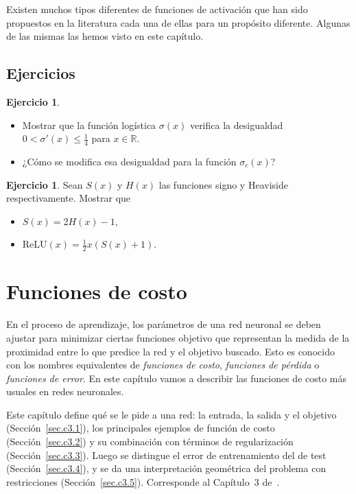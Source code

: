 \documentclass[12pt, a4paper]{amsbook}
\newcommand{\R}{{\mathbb R}}
\theoremstyle{remark}
\theoremstyle{definition}
\newtheorem{ejer}[teo]{Ejercicio}
\numberwithin{section}{chapter}
\numberwithin{subsection}{section}
\numberwithin{equation}{section}
\numberwithin{figure}{chapter}
\begin{document}
Existen muchos tipos diferentes de funciones de activación que han sido propuestos en la literatura cada una de ellas para un propósito diferente. Algunas de las mismas las hemos visto en este capítulo.


\section{Ejercicios}\label{sec.c2.3}
\begin{ejer}
\begin{itemize}
\item[(a)] Mostrar que la función logística $\sigma(x)$ verifica la desigualdad $0<\sigma'(x)\le \frac14$ para $x\in\R$.

\item[(b)] ¿Cómo se modifica esa desigualdad para la función $\sigma_c(x)$?
\end{itemize}
\end{ejer}

\begin{ejer}
Sean $S(x)$ y $H(x)$ las funciones signo y Heaviside respectivamente. Mostrar que
\begin{itemize}
\item[(a)] $S(x)=2H(x) - 1$,

\item[(b)] $\text{ReLU}(x) = \frac12 x(S(x)+1)$.
\end{itemize}
\end{ejer}



\chapter{Funciones de costo}\label{cap3}

En el proceso de aprendizaje, los parámetros de una red neuronal se deben ajustar para minimizar ciertas funciones objetivo que representan la medida de la proximidad entre lo que predice la red y el objetivo buscado. Esto es conocido con los nombres equivalentes de {\em funciones de costo}, {\em funciones de pérdida} o {\em funciones de error}. En este capítulo vamos a describir las funciones de costo más usuales en redes neuronales.


Este capítulo define qué se le pide a una red: la entrada, la salida y el objetivo (Sección~\ref{sec.c3.1}), los principales ejemplos de función de costo (Sección~\ref{sec.c3.2}) y su combinación con términos de regularización (Sección~\ref{sec.c3.3}). Luego se distingue el error de entrenamiento del de test (Sección~\ref{sec.c3.4}), y se da una interpretación geométrica del problema con restricciones (Sección~\ref{sec.c3.5}). Corresponde al Capítulo~3 de~\cite{Calin}.
\end{document}
